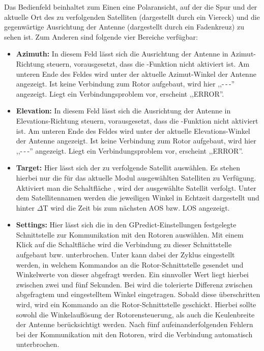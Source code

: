 Das Bedienfeld beinhaltet zum Einen eine Polaransicht, auf der die Spur und der aktuelle Ort des zu verfolgenden Satelliten (dargestellt durch ein Viereck) und die gegenwärtige Ausrichtung der Antenne (dargestellt durch ein Fadenkreuz) zu sehen ist. Zum Anderen sind folgende vier Bereiche verfügbar:

\begin{itemize}
	\parskip0pt
	\item \textbf{Azimuth:} In diesem Feld lässt sich die Ausrichtung der Antenne in Azimut-Richtung steuern, vorausgesetzt, dass die -Funktion nicht aktiviert ist. Am unteren Ende des Feldes wird unter  der aktuelle Azimut-Winkel der Antenne angezeigt. Ist keine Verbindung zum Rotor aufgebaut, wird hier ,,-\,-\,-'' angezeigt. Liegt ein Verbindungsproblem vor, erscheint ,,ERROR''.
	\item \textbf{Elevation:} In diesem Feld lässt sich die Ausrichtung der Antenne in Elevations-Richtung steuern, vorausgesetzt, dass die -Funktion nicht aktiviert ist. Am unteren Ende des Feldes wird unter  der aktuelle Elevations-Winkel der Antenne angezeigt. Ist keine Verbindung zum Rotor aufgebaut, wird hier ,,-\,-\,-'' angezeigt. Liegt ein Verbindungsproblem vor, erscheint ,,ERROR''.
	\item \textbf{Target:} Hier lässt sich der zu verfolgende Satellit auswählen. Es stehen hierbei nur die für das aktuelle Modul ausgewählten Satelliten zu Verfügung. Aktiviert man die Schaltfläche , wird der ausgewählte Satellit verfolgt. Unter dem Satellitennamen werden die jeweiligen Winkel in Echtzeit dargestellt und hinter $\Delta$T wird die Zeit bis zum nächsten \ac{AOS} bzw. \ac{LOS} angezeigt.
	\clearpage
	\item \textbf{Settings:} Hier lässt sich die in den GPredict-Einstellungen festgelegte Schnittstelle zur Kommunikation mit den Rotoren auswählen. Mit einem Klick auf die Schaltfläche  wird die Verbindung zu dieser Schnittstelle aufgebaut bzw. unterbrochen. Unter  kann dabei der Zyklus eingestellt werden, in welchem Kommandos an die Rotor-Schnittstelle gesendet und Winkelwerte von dieser abgefragt werden. Ein sinnvoller Wert liegt hierbei zwischen zwei und fünf Sekunden. Bei  wird die tolerierte Differenz zwischen abgefragtem und eingestelltem Winkel eingetragen. Sobald diese überschritten wird, wird ein  Kommando an die Rotor-Schnittstelle geschickt. Hierbei sollte sowohl die Winkelauflösung der Rotorensteuerung, als auch die Keulenbreite der Antenne berücksichtigt werden. Nach fünf aufeinanderfolgenden Fehlern bei der Kommunikation mit den Rotoren, wird die Verbindung automatisch unterbrochen.
\end{itemize}

